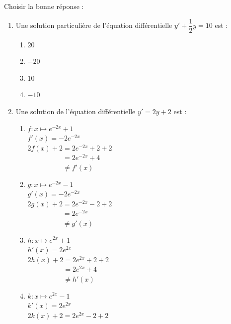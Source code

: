 \documentclass[a4paper,11pt,exos]{nsi} %
\begin{document}
\exo{}
Choisir la bonne réponse :
\begin{enumerate}
    \item Une solution particulière de l'équation différentielle $y'+\dfrac{1}{2}y=10$ est :
    \textcolor{UGLiBlue}{
    \begin{multicols}{4}
        \begin{enumerate}[label=]
            \item {} $20$
            \item {} $-20$
            \item {} $10$
            \item {} $-10$
        \end{enumerate}
    \end{multicols}}

    \item Une solution de l'équation différentielle $y'=2y+2$ est :
    \textcolor{UGLiBlue}{
    \begin{multicols}{2}
        \begin{enumerate}[label=]
            \item {} $f:x\mapsto e^{-2x}+1$\\[.5em]
            $f'(x)=-2e^{-2x}$\\
            $2f(x)+2=2e^{-2x}+2+2$\\
            $\phantom{2f(x)+2}=2e^{-2x}+4$\\
            $\phantom{2f(x)+2}\neq f'(x)$
            \item {} $g:x\mapsto e^{-2x}-1$\\[.5em]
            $g'(x)=-2e^{-2x}$\\
            $2g(x)+2=2e^{-2x}-2+2$\\
            $\phantom{2g(x)+2}=2e^{-2x}$\\
            $\phantom{2g(x)+2}\neq g'(x)$
            \item {} $h:x\mapsto e^{2x}+1$\\[.5em]
            $h'(x)=2e^{2x}$\\
            $2h(x)+2=2e^{2x}+2+2$\\
            $\phantom{2h(x)+2}=2e^{2x}+4$\\
            $\phantom{2h(x)+2}\neq h'(x)$
            \item {} $k:x\mapsto e^{2x}-1$\\[.5em]
            $k'(x)=2e^{2x}$\\
            $2k(x)+2=2e^{2x}-2+2$\\

\end{enumerate}
\end{multicols}}
\end{enumerate}
\end{document}

